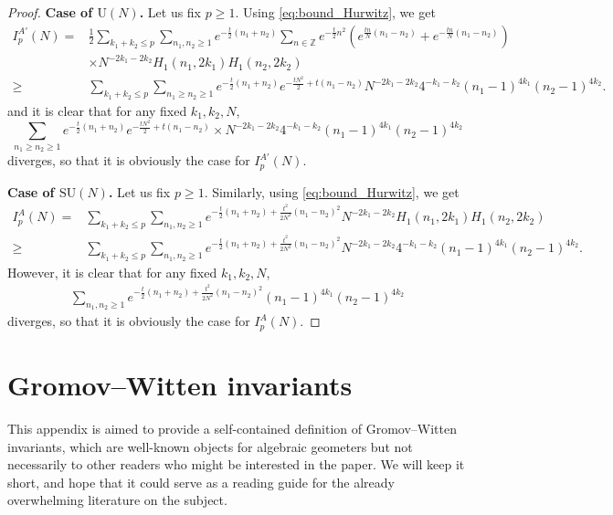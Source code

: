 \documentclass[11pt,a4paper,reqno]{article}
\theoremstyle{definition}
\theoremstyle{remark}
\newcommand\SU{{\mathrm{SU}}}
\newcommand\U{{\mathrm U}}
\newcommand\Z{{\mathbb Z}}
\begin{document}
\begin{proof}
{\bf Case of $\U(N)$.}  Let us fix $p\geq 1$. Using \eqref{eq:bound_Hurwitz}, we get
\begin{align*}
I_p^{A'}(N)= & \frac{1}{2}\sum_{k_1+k_2\leq p} \sum_{n_1,n_2\geq 1}e^{-\frac{t}{2}(n_1+n_2)} \sum_{n \in \Z} e^{-\frac{t}{2}n^2}\left(e^{ \frac{tn}{N}(n_1-n_2)} + e^{-\frac{tn}{N}(n_1-n_2)}\right)\\
& \times N^{-2k_1-2k_2}H_1(n_1,2k_1)H_1(n_2,2k_2)\\
\geq & \sum_{k_1+k_2\leq p} \sum_{n_1 \geq n_2\geq 1}e^{-\frac{t}{2}(n_1+n_2)}e^{-\frac{tN^2}{2} + t(n_1 - n_2)} N^{-2k_1-2k_2}4^{-k_1-k_2}(n_1-1)^{4k_1}(n_2-1)^{4k_2}.
\end{align*}
and it is clear that for any fixed $k_1,k_2,N$,
\[ \sum_{n_1 \geq n_2\geq 1}e^{-\frac{t}{2}(n_1+n_2)}e^{-\frac{tN^2}{2} + t(n_1 - n_2)}  \times N^{-2k_1-2k_2}4^{-k_1-k_2}(n_1-1)^{4k_1}(n_2-1)^{4k_2}\]
diverges, so that it is obviously the case for $I_p^{A'}(N)$.

{\bf Case of $\SU(N)$.} Let us fix $p\geq 1$. Similarly, using \eqref{eq:bound_Hurwitz}, we get
\begin{align*}
I_p^A(N)= & \sum_{k_1+k_2\leq p} \sum_{n_1,n_2\geq 1}e^{-\frac{t}{2}(n_1+n_2)+\frac{t^2}{2N^2}(n_1-n_2)^2} N^{-2k_1-2k_2}H_1(n_1,2k_1)H_1(n_2,2k_2)\\
\geq & \sum_{k_1+k_2\leq p} \sum_{n_1,n_2\geq 1}e^{-\frac{t}{2}(n_1+n_2)+\frac{t^2}{2N^2}(n_1-n_2)^2} N^{-2k_1-2k_2}4^{-k_1-k_2}(n_1-1)^{4k_1}(n_2-1)^{4k_2}.
\end{align*}
However, it is clear that for any fixed $k_1,k_2,N$,
\begin{align*}
\sum_{n_1,n_2\geq 1}e^{-\frac{t}{2}(n_1+n_2)+\frac{t^2}{2N^2}(n_1-n_2)^2}(n_1-1)^{4k_1}(n_2-1)^{4k_2}
\end{align*}
diverges, so that it is obviously the case for $I_p^A(N)$.
\end{proof}


\section{Gromov--Witten invariants}\label{sec:GW}

This appendix is aimed to provide a self-contained definition of Gromov--Witten invariants, which are well-known objects for algebraic geometers but not necessarily to other readers who might be interested in the paper. We will keep it short, and hope that it could serve as a reading guide for the already overwhelming literature on the subject.
\end{document}
